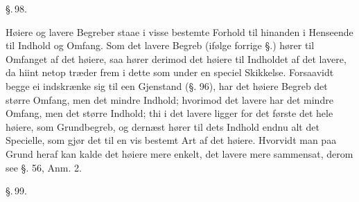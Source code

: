 \documentclass[12pt]{book}
\def\textit#1{#1}%
\def\emph#1{#1}%
\newcommand{\parag}[1]{%
  \par\vspace{0.9\baselineskip}%
  {\centering\textit{\S.\,#1.}\par}%
  \vspace{0.35\baselineskip}%
  \noindent\hspace{\parindent}\ignorespaces
}
\newcommand{\opage}[1]{\marginnote{\footnotesize\textit{[#1]}}}
\begin{document}
\parag{98}

\emph{Høiere og lavere Begreber staae i visse bestemte Forhold til hinanden i Henseende
til Indhold og Omfang.} Som det lavere Begreb (ifølge forrige §.) hører til Omfanget af
det
\opage{244}høiere, saa hører derimod det høiere til Indholdet af det lavere, da hiint netop træder
frem i dette som under en speciel Skikkelse. Forsaavidt begge ei indskrænke sig til een
Gjenstand (§. 96), har det høiere Begreb det større Omfang, men det mindre Indhold;
hvorimod det lavere har det mindre Omfang, men det større Indhold; thi i det lavere
ligger for det første det hele høiere, som Grundbegreb, og dernæst hører til dets
Indhold endnu alt det Specielle, som gjør det til en vis bestemt Art af det høiere.
Hvorvidt man paa Grund heraf kan kalde det høiere mere enkelt, det lavere mere
sammensat, derom see §. 56, Anm. 2.

\parag{99}
\end{document}
